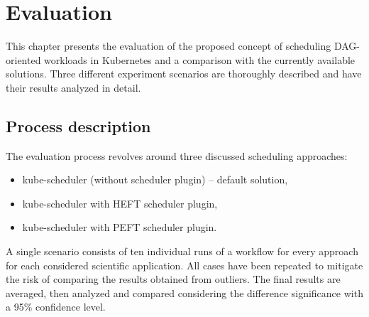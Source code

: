 \thispagestyle{only-cfoot}
\section{Evaluation}\label{s:Evaluation}



This chapter presents the evaluation of the proposed concept of scheduling DAG-oriented workloads in Kubernetes and a comparison with the currently available solutions.
Three different experiment scenarios are thoroughly described and have their results analyzed in detail.

\subsection{Process description}\label{s:Evaluation:ProcessDescription}
The evaluation process revolves around three discussed scheduling approaches:

\begin{itemize}[topsep=0pt]
    \item{
kube-scheduler (without scheduler plugin) -- default solution,
}
    \item{
kube-scheduler with HEFT scheduler plugin,
}
    \item{
kube-scheduler with PEFT scheduler plugin.
}
\end{itemize}
A single scenario consists of ten individual runs of a workflow for every approach for each considered scientific application.
All cases have been repeated to mitigate the risk of comparing the results obtained from outliers.
The final results are averaged, then analyzed and compared considering the difference significance with a 95\% confidence level.










